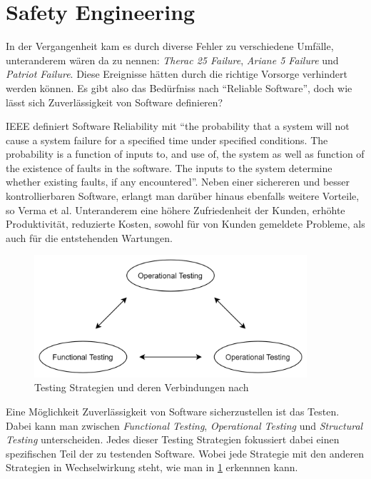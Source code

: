     \section{Safety Engineering}
        In der Vergangenheit kam es durch diverse Fehler zu verschiedene Umfälle, unteranderem wären da zu nennen:
        \textit{Therac 25 Failure}, \textit{Ariane 5 Failure} und \textit{Patriot Failure}. Diese Ereignisse hätten
        durch die richtige Vorsorge verhindert werden können.\cite[p. 185]{Verma2015} Es gibt also das Bedürfniss
        nach ``Reliable Software'', doch wie lässt sich Zuverlässigkeit von Software definieren?

        IEEE definiert Software Reliability mit ``the probability that a system will not cause a system failure
        for a specified time under specified conditions. The probability is a function of inputs to, and use of,
        the system as well as function of the existence of faults in the software. The inputs to the system
        determine whether existing faults, if any encountered''.\cite[p. 183]{Verma2015} Neben einer sichereren und
        besser kontrollierbaren Software, erlangt man darüber hinaus ebenfalls weitere Vorteile, so Verma et al.
        Unteranderem eine höhere Zufriedenheit der Kunden, erhöhte Produktivität, reduzierte Kosten, sowohl für
        von Kunden gemeldete Probleme, als auch für die entstehenden Wartungen.

        \begin{figure}[h]
            \begin{center}
                \includegraphics[width=0.9\textwidth]{figures/testing.png}
                \caption[Testing Strategies]{Testing Strategien und deren Verbindungen nach \cite{bertolino2019}}
                \label{pic:testing-strategies}
            \end{center}
        \end{figure}

        Eine Möglichkeit Zuverlässigkeit von Software sicherzustellen ist das Testen. Dabei kann man zwischen
        \textit{Functional Testing}, \textit{Operational Testing} und \textit{Structural Testing} unterscheiden.
        Jedes dieser Testing Strategien fokussiert dabei einen spezifischen Teil der zu testenden Software. \cite[p. 26]{bertolino2019}
        Wobei jede Strategie mit den anderen Strategien in Wechselwirkung steht, wie man in \ref{pic:testing-strategies}
        erkennnen kann.

